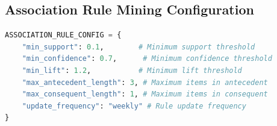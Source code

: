 \documentclass[12pt,a4paper]{article}
\begin{document}
\subsection{Association Rule Mining Configuration}
\begin{lstlisting}[language=Python, caption=Configuration Parameters]
ASSOCIATION_RULE_CONFIG = {
    "min_support": 0.1,        # Minimum support threshold
    "min_confidence": 0.7,      # Minimum confidence threshold
    "min_lift": 1.2,           # Minimum lift threshold
    "max_antecedent_length": 3, # Maximum items in antecedent
    "max_consequent_length": 1, # Maximum items in consequent
    "update_frequency": "weekly" # Rule update frequency
}
\end{lstlisting}
\end{document}
